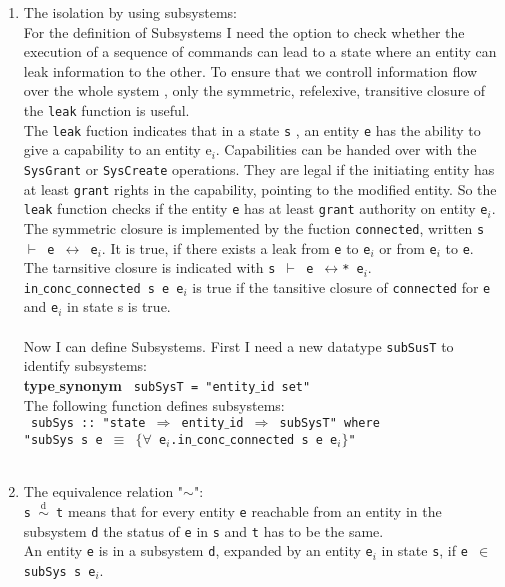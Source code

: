\begin{enumerate}
\item The isolation by using subsystems: \\
For the definition of Subsystems I need the option to check whether  the execution of a sequence of commands can lead to a state where an entity can leak information to the other. To ensure that we controll information flow over the whole system , only the symmetric, refelexive, transitive closure of the \texttt{leak} function is useful. \\
The  \texttt{leak} fuction \cite{TakeG} indicates that in a state \texttt{s} , an entity \texttt{e} has the ability to give a capability to an entity e$_i$. Capabilities can be handed over with the \texttt{SysGrant} or \texttt{SysCreate} operations. They are legal if the initiating entity has at least \texttt{grant} rights in the capability, pointing to the modified entity. So the \texttt{leak} function checks if the entity \texttt{e} has at least \texttt{grant} authority on entity \texttt{e$_i$}. The symmetric closure is implemented by the fuction \texttt{connected}, written \texttt{s $\vdash$ e $\longleftrightarrow$ e$_i$}. It is true, if there exists a leak from \texttt{e} to \texttt{e$_i$} or from \texttt{e$_i$} to \texttt{e}. \\
The tarnsitive closure is indicated with \texttt{s $\vdash$ e $\longleftrightarrow$* e$_i$}. \\
\texttt{in$\_$conc$\_$connected s e e$_i$} is true  if the tansitive closure of \texttt{connected} for \texttt{e} and \texttt{e$_i$} in state s is true. \\ \\
Now I can define Subsystems. First I need a new datatype \texttt{subSusT} to identify subsystems: \\ 

{\textbf{type$\_$synonym}
\texttt{
subSysT = "entity$\_$id set"}} \\ 

The following function defines subsystems: \\

{
\texttt{
subSys :: "state $\Rightarrow$ entity$\_$id $\Rightarrow$ subSysT" where \\ 
"subSys s e $\equiv$ $\{\forall$ e$_i$.in$\_$conc$\_$connected s e e$_i\}$"}} \\ \\

\item The equivalence relation "$\sim$": \\
\texttt{s $\overset{\text{d}}{\sim}$ t} means that for every entity \texttt{e} reachable from an entity in the subsystem \texttt{d} the status of \texttt{e} in \texttt{s} and \texttt{t} has to be the same. \\
An entity \texttt{e} is in a subsystem \texttt{d}, expanded by an entity \texttt{e$_i$} in state \texttt{s}, if \texttt{e $\in$ subSys s e$_i$}.


\end{enumerate}
